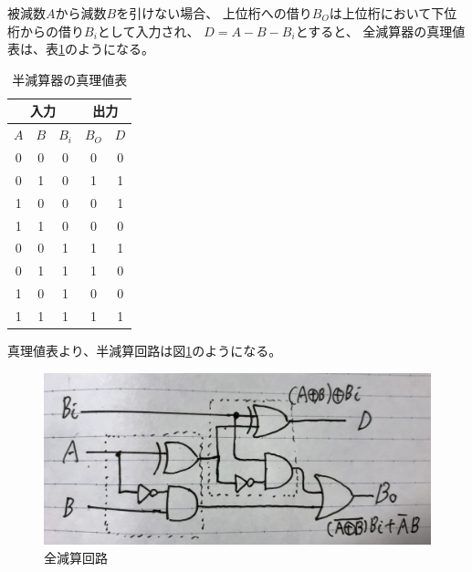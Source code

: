 \documentclass[12pt]{jarticle}
\begin{document}
\begin{itemize}
          被減数$A$から減数$B$を引けない場合、
          上位桁への借り$B_O$は上位桁において下位桁からの借り$B_i$として入力され、
          $D = A - B - B_i$とすると、
          全減算器の真理値表は、表\ref{repotbl5}のようになる。
          \begin{table}[h]
              \caption{半減算器の真理値表}
              \begin{center}
                  \begin{tabular}{|ccc|cc|}
                      \hline
                      \multicolumn{3}{|c|}{入力} & \multicolumn{2}{|c|}{出力}                       \\
                      \hline
                      $A$                        & $B$                        & $B_i$ & $B_O$ & $D$ \\
                      \hline
                      0                          & 0                          & 0     & 0     & 0   \\
                      0                          & 1                          & 0     & 1     & 1   \\
                      1                          & 0                          & 0     & 0     & 1   \\
                      1                          & 1                          & 0     & 0     & 0   \\
                      0                          & 0                          & 1     & 1     & 1   \\
                      0                          & 1                          & 1     & 1     & 0   \\
                      1                          & 0                          & 1     & 0     & 0   \\
                      1                          & 1                          & 1     & 1     & 1   \\
                      \hline
                  \end{tabular}
              \end{center}
              \label{repotbl5}
          \end{table}

          真理値表より、半減算回路は図\ref{fig2}のようになる。
          \begin{figure}[h]
              \begin{center}
                  \includegraphics[bb=0 0 4032 3024,height=5cm]{report3_fig2.jpg}
              \end{center}
              \caption{全減算回路}
              \label{fig2}
          \end{figure}



\end{itemize}
\end{document}
